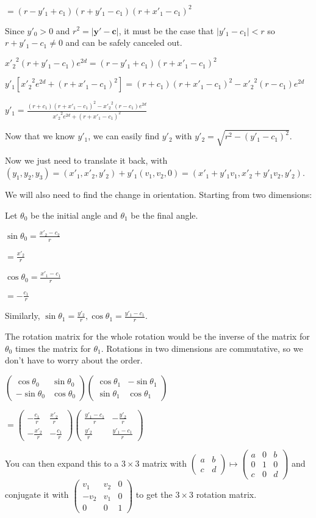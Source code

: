 \documentclass[12pt]{amsart}
\newcommand{\mat}[4]{\left(\begin{array}{ccc} #1 & #2 \\#3 & #4 \end{array} \right)}
\newcommand{\matc}[9]{\left(\begin{array}{ccc} #1 & #2 & #3 \\#4 & #5 & #6 \\#7 & #8 & #9 \end{array} \right)}
\begin{document}
$= (r-y'_1+c_1)(r+y'_1-c_1)(r+x'_1-c_1)^2$

Since $y'_0 > 0$ and $r^2 = |\textbf{y}'-\textbf{c}|$, it must be the case that $|y'_1-c_1| < r$ so $r+y'_1-c_1 \neq 0$ and can be safely canceled out.

${x'_2}^2(r+y'_1-c_1)e^{2d} = (r-y'_1+c_1)(r+x'_1-c_1)^2$

$y'_1[{x'_2}^2e^{2d}+(r+x'_1-c_1)^2] = (r+c_1)(r+x'_1-c_1)^2-{x'_2}^2(r-c_1)e^{2d}$

$y'_1 = \frac{(r+c_1)(r+x'_1-c_1)^2-{x'_2}^2(r-c_1)e^{2d}}{{x'_2}^2e^{2d}+(r+x'_1-c_1)^2}$


Now that we know $y'_1$, we can easily find $y'_2$ with $y'_2 = \sqrt{r^2-({y'_1}-c_1)^2}$.

Now we just need to translate it back, with $(y_1,y_2,y_3) = (x'_1,x'_2,y'_2)+y'_1(v_1,v_2,0) = (x'_1+y'_1v_1,x'_2+y'_1v_2,y'_2)$.

We will also need to find the change in orientation. Starting from two dimensions:

Let $\theta_0$ be the initial angle and $\theta_1$ be the final angle.

$\sin \theta_0 = \frac{x'_2-c_2}{r}$

$= \frac{x'_2}{r}$

$\cos \theta_0 = \frac{x'_1-c_1}{r}$

$= -\frac{c_1}{r}$

Similarly, $\sin \theta_1 = \frac{y'_2}{r}, \cos \theta_1 = \frac{y'_1-c_1}{r}$.

The rotation matrix for the whole rotation would be the inverse of the matrix for $\theta_0$ times the matrix for $\theta_1$. Rotations in two dimensions are commutative, so we don't have to worry about the order.

$\mat{\cos \theta_0}{\sin \theta_0}{-\sin \theta_0}{\cos \theta_0} \mat{\cos \theta_1}{-\sin \theta_1}{\sin \theta_1}{\cos \theta_1}$

$= \mat{-\frac{c_1}{r}}{\frac{x'_2}{r}}{-\frac{x'_2}{r}}{-\frac{c_1}{r}} \mat{\frac{y'_1-c_1}{r}}{-\frac{y'_2}{r}}{\frac{y'_2}{r}}{\frac{y'_1-c_1}{r}}$

You can then expand this to a $3 \times 3$ matrix with $\mat{a}{b}{c}{d} \mapsto \matc{a}{0}{b}{0}{1}{0}{c}{0}{d}$ and conjugate it with $\matc{v_1}{v_2}{0}{-v_2}{v_1}{0}{0}{0}{1}$ to get the $3 \times 3$ rotation matrix.
\end{document}
